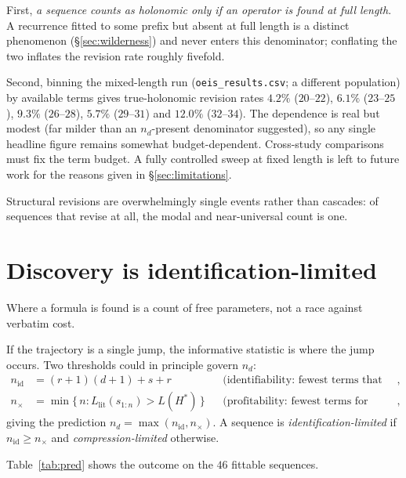 \documentclass[10pt]{article}
\theoremstyle{definition}
\theoremstyle{plain}
\newcommand{\Llit}{L_{\mathrm{lit}}}
\newcommand{\nid}{n_{\mathrm{id}}}
\newcommand{\nx}{n_{\times}}
\newcommand{\nd}{n_{d}}
\begin{document}
First, \emph{a sequence counts as holonomic only if an operator is found at
full length}. A recurrence fitted to some prefix but absent at full length is a
distinct phenomenon (\S\ref{sec:wilderness}) and never enters this denominator;
conflating the two inflates the revision rate roughly fivefold.

Second, binning the mixed-length run (\texttt{oeis\_results.csv}; a different population) by available terms gives true-holonomic revision rates
$4.2\%$ ($20$--$22$), $6.1\%$ ($23$--$25$), $9.3\%$ ($26$--$28$),
$5.7\%$ ($29$--$31$) and $12.0\%$ ($32$--$34$).
The dependence is real but modest (far milder than an $n_d$-present
denominator suggested), so any single headline figure remains somewhat
budget-dependent. Cross-study comparisons must fix the term budget. A fully
controlled sweep at fixed length is left to future work for the reasons given
in \S\ref{sec:limitations}.

Structural revisions are overwhelmingly single events rather than cascades: of
sequences that revise at all, the modal and near-universal count is one.

\section{Discovery is identification-limited}
\label{sec:idlimited}

Where a formula is found is a count of free parameters, not a race against
verbatim cost.

If the trajectory is a single jump, the informative statistic is where the jump
occurs. Two thresholds could in principle govern $\nd$:
\begin{align}
\nid &= (r{+}1)(d{+}1) + s + r
 && \text{(identifiability: fewest terms that determine the operator)},\\
\nx  &= \min\{\, n : \Llit(s_{1:n}) > L(H^{*}) \,\}
 && \text{(profitability: fewest terms for which it pays)},
\end{align}
giving the prediction $\nd = \max(\nid, \nx)$. A sequence is
\emph{identification-limited} if $\nid \ge \nx$ and \emph{compression-limited}
otherwise.

Table~\ref{tab:pred} shows the outcome on the $46$ fittable sequences.

\begin{table}[t]
\centering
\small

\caption{Prediction of the discovery point $\nd$. The identifiability bound
alone accounts for the data; the compression threshold alone does not.}
\label{tab:pred}
\end{table}
\end{document}
